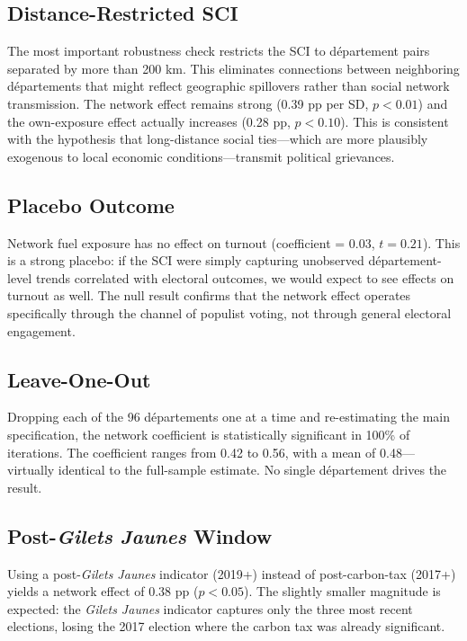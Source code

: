 \documentclass[12pt]{article}
\newcommand{\gj}{\textit{Gilets Jaunes}}
\newcommand{\dept}{d\'{e}partement}
\newcommand{\depts}{d\'{e}partements}
\begin{document}
\subsection{Distance-Restricted SCI}

The most important robustness check restricts the SCI to \dept{} pairs separated by more than 200 km. This eliminates connections between neighboring \depts{} that might reflect geographic spillovers rather than social network transmission. The network effect remains strong (0.39 pp per SD, $p < 0.01$) and the own-exposure effect actually increases (0.28 pp, $p < 0.10$). This is consistent with the hypothesis that long-distance social ties---which are more plausibly exogenous to local economic conditions---transmit political grievances.

\subsection{Placebo Outcome}

Network fuel exposure has no effect on turnout (coefficient = 0.03, $t = 0.21$). This is a strong placebo: if the SCI were simply capturing unobserved \dept{}-level trends correlated with electoral outcomes, we would expect to see effects on turnout as well. The null result confirms that the network effect operates specifically through the channel of populist voting, not through general electoral engagement.

\subsection{Leave-One-Out}

Dropping each of the 96 \depts{} one at a time and re-estimating the main specification, the network coefficient is statistically significant in 100\% of iterations. The coefficient ranges from 0.42 to 0.56, with a mean of 0.48---virtually identical to the full-sample estimate. No single \dept{} drives the result.

\subsection{Post-\gj{} Window}

Using a post-\gj{} indicator (2019+) instead of post-carbon-tax (2017+) yields a network effect of 0.38 pp ($p < 0.05$). The slightly smaller magnitude is expected: the \gj{} indicator captures only the three most recent elections, losing the 2017 election where the carbon tax was already significant.
\end{document}

